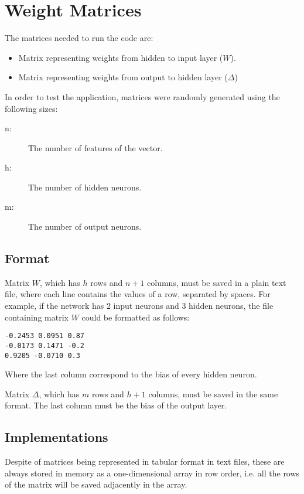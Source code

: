 \section{Weight Matrices}

The matrices needed to run the code are:
\begin{itemize}
 \item Matrix representing weights from hidden to input layer ($W$).
 \item Matrix representing weights from output to hidden layer ($\Delta$)
\end{itemize}

In order to test the application, matrices were randomly generated using the following sizes:
\begin{description}
 \item[n:] The number of features of the vector.
 \item[h:] The number of hidden neurons.
 \item[m:] The number of output neurons.
\end{description}


\subsection*{Format}

Matrix $W$, which has $h$ rows and $n+1$ columns, must be saved in a plain text file,
where each line contains the values of a row, separated by spaces.
For example, if the network has $2$ input neurons and $3$ hidden neurons, the file containing matrix $W$
could be formatted as follows:
\begin{verbatim}
-0.2453 0.0951 0.87
-0.0173 0.1471 -0.2
0.9205 -0.0710 0.3
\end{verbatim}
Where the last column correspond to the bias of every hidden neuron.

Matrix $\Delta$, which has $m$ rows and $h+1$ columns,
must be saved in the same format.
The last column must be the bias of the output layer.

\subsection*{Implementations}

Despite of matrices being represented in tabular format in text files,
these are always stored in memory as a one-dimensional array in row order,
i.e. all the rows of the matrix will be saved adjacently in the array.

